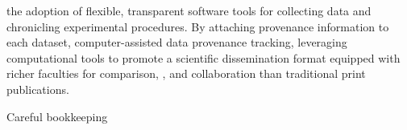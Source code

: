 the adoption of flexible, transparent software tools for collecting
data and chronicling experimental procedures. By attaching provenance
information to each dataset,
computer-assisted data provenance tracking, leveraging computational
tools to promote a scientific dissemination format equipped with
richer faculties for comparison, , and collaboration than traditional
print publications.

Careful bookkeeping
